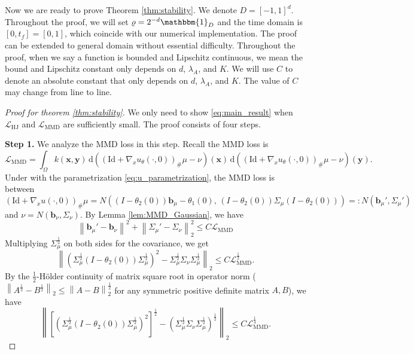 \documentclass{article} %
\theoremstyle{plain}
\theoremstyle{definition}
\theoremstyle{remark}
\newcommand{\norm}[2][H^s]{\left\|#2\right\|_{#1}}
\newcommand{\bx}{\mathbf{x}}
\newcommand{\by}{\mathbf{y}}
\newcommand{\bb}{\mathbf{b}}
\newcommand{\LMMD}{\mathcal{L}_{\text{MMD}}}
\newcommand{\LHJ}{\mathcal{L}_{\text{HJ}}}
\newcommand{\lam}{\lambda}
\newcommand{\nx}{\nabla_x}
\newcommand{\rd}{\mathrm{d}}
\newcommand{\parentheses}[1]{\left(#1\right)}
\newcommand{\sqbra}[1]{\left[#1\right]}
\begin{document}
Now we are ready to prove Theorem \ref{thm:stability}. We denote $D = [-1,1]^d$. Throughout the proof, we will set $\varrho = 2^{-d} \mathbbm{1}_{D}$ and the time domain is $[0,t_f]=[0,1]$, which coincide with our numerical implementation. The proof can be extended to general domain without essential difficulty. Throughout the proof, when we say a function is bounded and Lipschitz continuous, we mean the bound and Lipschitz constant only depends on $d$, $\lam_A$, and $K$. We will use $C$ to denote an absolute constant that only depends on $d$, $\lam_A$, and $K$. The value of $C$ may change from line to line.

\begin{proof}[Proof for theorem \ref{thm:stability}]
We only need to show \eqref{eq:main_result} when $\LHJ$ and $\LMMD$ are sufficiently small. The proof consists of four steps.

\medskip

\medskip
\textbf{Step 1.} We analyze the MMD loss in this step. Recall the MMD loss is
$$\LMMD=\int_\Omega k(\bx,\by) \,\rd((\textrm{Id} + \nx u_\theta(\cdot,0))_\# \mu - \nu)(\bx) \,\rd((\textrm{Id} + \nx u_\theta(\cdot,0))_\# \mu - \nu)(\by).$$
Under with the parametrization \eqref{eq:u_parametrization}, the MMD loss is between 
$$(\textrm{Id} + \nx u(\cdot,0))_\# \mu = N\parentheses{(I-\theta_2(0))\bb_\mu - \theta_1(0), \, (I-\theta_2(0)) \Sigma_\mu (I-\theta_2(0))} =: N(\bb_\mu',\Sigma_\mu')$$ 
and $\nu = N(\bb_\nu,\Sigma_\nu)$. By Lemma \ref{lem:MMD_Gaussian}, we have
\begin{equation}\label{eq:Lemma_MMD}
\norm[]{\bb_\mu'-\bb_\nu}^2 + \norm[2]{\Sigma_\mu'-\Sigma_\nu}^2 \le C \LMMD
\end{equation}
Multiplying $\Sigma_\mu^{\frac12}$ on both sides for the covariance, we get
\begin{equation*}
\norm[2]{\parentheses{\Sigma_\mu^{\frac12}(I-\theta_2(0))\Sigma_\mu^{\frac12}}^2 - \Sigma_\mu^{\frac12} \Sigma_\nu \Sigma_\mu^{\frac12}} \le C \LMMD^{\frac12}.
\end{equation*}
By the $\frac12$-H\"older continuity of matrix square root in operator norm \cite[Theorem X.1.1]{bhatia2013matrix} ($\norm[2]{A^{\frac12}-B^{\frac12}} \le \norm[2]{A-B}^{\frac12}$ for any symmetric positive definite matrix $A,B$), we have 
\begin{equation}\label{eq:step1_temp1}
\norm[2]{\sqbra{\parentheses{\Sigma_\mu^{\frac12}(I-\theta_2(0))\Sigma_\mu^{\frac12}}^2}^{\frac12} - \parentheses{\Sigma_\mu^{\frac12} \Sigma_\nu \Sigma_\mu^{\frac12}}^{\frac12}} \le C \LMMD^{\frac14}.
\end{equation}


\end{proof}
\end{document}
